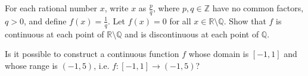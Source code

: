 \documentclass{ximera}
\begin{document}
\begin{exercise}
    For each rational number $x$, write $x$ as $\frac{p}q$, where $p,q \in \mathbb{Z}$ have no common factors, $q> 0$, and define $f(x) = \frac{1}q$.  Let $f(x) = 0$ for all $x \in \mathbb{R}\setminus \mathbb{Q}$.  Show that $f$ is continuous at each point of $\mathbb{R}\setminus\mathbb{Q}$ and is discontinuous at each point of $\mathbb{Q}$.
\end{exercise}

\begin{exercise}
    Is it possible to construct a  continuous function $f$ whose domain is $[-1,1]$ and whose range is $(-1,5)$, i.e. $f:[-1,1] \to (-1,5)$?
\end{exercise}
\end{document}
